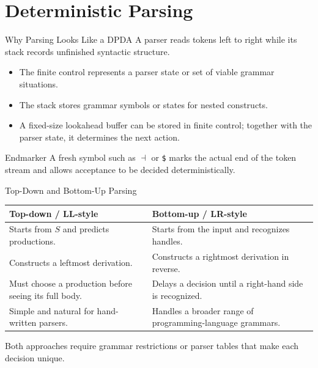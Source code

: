 \documentclass[10pt]{beamer}
\begin{document}
\section{Deterministic Parsing}

\begin{frame}{Why Parsing Looks Like a DPDA}
  A parser reads tokens left to right while its stack records unfinished syntactic structure.
  \begin{itemize}
    \item The finite control represents a parser state or set of viable grammar situations.
    \item The stack stores grammar symbols or states for nested constructs.
    \item A fixed-size lookahead buffer can be stored in finite control;
      together with the parser state, it determines the next action.
  \end{itemize}
  \pause
  \begin{block}{Endmarker}
    A fresh symbol such as $\dashv$ or \texttt{\$} marks the actual end of the token stream and allows
    acceptance to be decided deterministically.
  \end{block}
\end{frame}

\begin{frame}{Top-Down and Bottom-Up Parsing}
  \begin{center}
  \begin{tabular}{L{5.0cm}L{5.0cm}}
    \toprule
    Top-down / LL-style & Bottom-up / LR-style \\
    \midrule
    Starts from $S$ and predicts productions. & Starts from the input and recognizes handles. \\
    Constructs a leftmost derivation. & Constructs a rightmost derivation in reverse. \\
    Must choose a production before seeing its full body. & Delays a decision until a right-hand side is recognized. \\
    Simple and natural for hand-written parsers. & Handles a broader range of programming-language grammars. \\
    \bottomrule
  \end{tabular}
  \end{center}
  Both approaches require grammar restrictions or parser tables that make each decision unique.
\end{frame}
\end{document}

